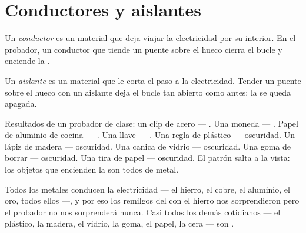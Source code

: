 \section{Conductores y aislantes}

\begin{definition}[Conductor]\label{def:g4:conductors-insulators:conductor}
Un \emph{conductor} es un material que deja viajar la
electricidad por su interior. En el probador, un conductor que tiende
un puente sobre el hueco cierra el bucle y enciende la .
\end{definition}

\begin{definition}[Aislante]\label{def:g4:conductors-insulators:insulator}
Un \emph{aislante} es un material que le corta el paso
a la electricidad. Tender un puente sobre el hueco con un aislante
deja el bucle tan abierto como antes: la  se queda apagada.
\end{definition}

\begin{example}\label{ex:g4:conductors-insulators:trials}
Resultados de un probador de clase: un clip de acero --- . Una
moneda --- . Papel de aluminio de cocina --- . Una llave
--- . Una regla de plástico --- oscuridad. Un lápiz de madera ---
oscuridad. Una canica de vidrio --- oscuridad. Una goma de borrar ---
oscuridad. Una tira de papel --- oscuridad. El patrón salta a la
vista: los objetos que encienden la  son todos de metal.
\end{example}

\begin{proposition}\label{prop:g4:conductors-insulators:metals}
Todos los metales conducen la electricidad --- el hierro, el cobre, el
aluminio, el oro, todos ellos ---, y por eso los remilgos del
 con el hierro nos sorprendieron pero el probador no nos
sorprenderá nunca. Casi todos los demás  cotidianos --- el
plástico, la madera, el vidrio, la goma, el papel, la cera --- son
.
\end{proposition}

